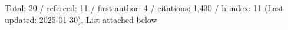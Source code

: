 Total: 20 / refereed: 11 / first author: 4 / citations: 1,430 / h-index: 11 (Last updated: 2025-01-30), List attached below